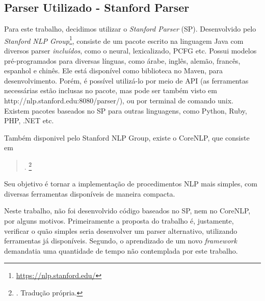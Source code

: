 \subsection{Parser Utilizado - Stanford Parser}
\label{sec:stanfordParser}
Para este trabalho, decidimos utilizar o \textit{Stanford Parser} (SP). Desenvolvido pelo \textit{Stanford NLP Group}\footnote{\url{https://nlp.stanford.edu/}}, consiste de um pacote escrito na linguagem Java com diversos parser \textit{incluídos}, como o neural, lexicalizado, PCFG etc. Possui modelos pré-programados para diversas línguas, como árabe, inglês, alemão, francês, espanhol e chinês. Ele está disponível como biblioteca no Maven, para desenvolvimento. Porém, é possível utilizá-lo por meio de API (as ferramentas necessárias estão inclusas no pacote, mas pode ser também visto em http://nlp.stanford.edu:8080/parser/), ou por terminal de comando unix. Existem pacotes baseados no SP para outras linguagens, como Python, Ruby, PHP, .NET etc.

Também disponivel pelo Stanford NLP Group, existe o CoreNLP, que consiste em \cite[p~55]{manning2014CoreNLP} 
\begin{quote}
    .
    \footnote{. Tradução própria.}
\end{quote}
Seu objetivo é tornar a implementação de procedimentos NLP mais simples, com diversas ferramentas disponíveis de maneira compacta.

Neste trabalho, não foi desenvolvido código baseados no SP, nem no CoreNLP, por alguns motivos. Primeiramente a proposta do trabalho é, justamente, verificar o quão simples seria desenvolver um parser alternativo, utilizando ferramentas já disponíveis. Segundo, o aprendizado de um novo \textit{framework} demandatia uma quantidade de tempo não contemplada por este trabalho.

